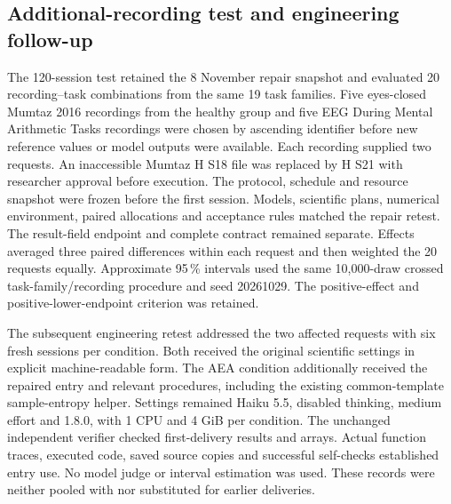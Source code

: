 \subsection{Additional-recording test and engineering follow-up}

The 120-session test retained the 8 November repair snapshot and evaluated 20 recording--task combinations from the same 19 task families. Five eyes-closed Mumtaz 2016 recordings from the healthy group and five EEG During Mental Arithmetic Tasks recordings were chosen by ascending identifier before new reference values or model outputs were available. Each recording supplied two requests. An inaccessible Mumtaz H S18 file was replaced by H S21 with researcher approval before execution. The protocol, schedule and resource snapshot were frozen before the first session. Models, scientific plans, numerical environment, paired allocations and acceptance rules matched the repair retest. The result-field endpoint and complete contract remained separate. Effects averaged three paired differences within each request and then weighted the 20 requests equally. Approximate 95\,\% intervals used the same 10,000-draw crossed task-family/recording procedure and seed 20261029. The positive-effect and positive-lower-endpoint criterion was retained.

The subsequent engineering retest addressed the two affected requests with six fresh sessions per condition. Both received the original scientific settings in explicit machine-readable form. The AEA condition additionally received the repaired entry and relevant procedures, including the existing common-template sample-entropy helper. Settings remained Haiku 5.5, disabled thinking, medium effort and \mne{} 1.8.0, with 1 CPU and 4 GiB per condition. The unchanged independent verifier checked first-delivery results and arrays. Actual function traces, executed code, saved source copies and successful self-checks established entry use. No model judge or interval estimation was used. These records were neither pooled with nor substituted for earlier deliveries.

